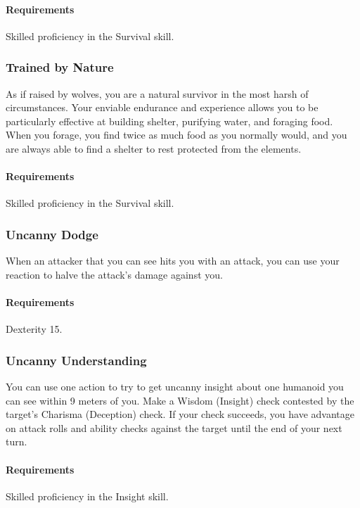     \paragraph{Requirements} Skilled proficiency in the Survival skill.
\subsubsection{Trained by Nature} \label{feat::trainedbynature}
    As if raised by wolves, you are a natural survivor in the most harsh of circumstances.
    Your enviable endurance and experience allows you to be particularly effective at building shelter, purifying water, and foraging food.
    When you forage, you find twice as much food as you normally would, and you are always able to find a shelter to rest protected from the elements.
    \paragraph{Requirements} Skilled proficiency in the Survival skill.
\subsubsection{Uncanny Dodge} \label{feat::uncannydodge}
    When an attacker that you can see hits you with an attack, you can use your reaction to halve the attack's damage against you.
    \paragraph{Requirements} Dexterity 15.
\subsubsection{Uncanny Understanding} \label{feat::uncannyinsight}
    You can use one action to try to get uncanny insight about one humanoid you can see within 9 meters of you.
    Make a Wisdom (Insight) check contested by the target's Charisma (Deception) check.
    If your check succeeds, you have advantage on attack rolls and ability checks against the target until the end of your next turn.
    \paragraph{Requirements} Skilled proficiency in the Insight skill.
